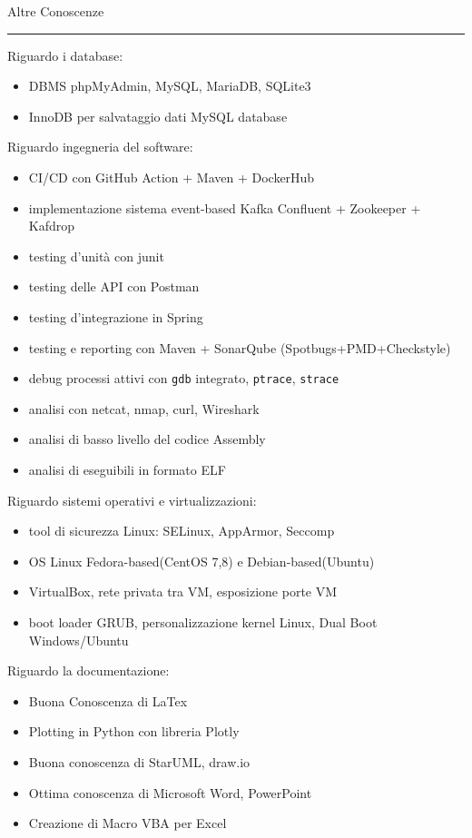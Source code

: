 \documentclass[a4paper]{letter}
\begin{document}
\hfill
\begin{minipage}[t]{0.65\textwidth}
\setlength{\baselineskip}{1.4\baselineskip}

\vspace{2 mm}
{\large Altre Conoscenze}
\rule{\linewidth}{0.4pt}
\vspace{1 mm}
{\medium Riguardo i database: }
\begin{itemize}
    \item DBMS phpMyAdmin, MySQL, MariaDB, SQLite3
    \item InnoDB per salvataggio dati MySQL database
\end{itemize}
\vspace{1 mm}
{\medium Riguardo ingegneria del software: }
\begin{itemize}
    \item CI/CD con GitHub Action + Maven + DockerHub
    \item implementazione sistema event-based Kafka Confluent + Zookeeper + Kafdrop
    \item testing d'unità con junit
    \item testing delle API con Postman
    \item testing d'integrazione in Spring
    \item testing e reporting con Maven + SonarQube (Spotbugs+PMD+Checkstyle)
    \item debug processi attivi con \texttt{gdb} integrato, \texttt{ptrace}, \texttt{strace}
    \item analisi con netcat, nmap, curl, Wireshark
    \item analisi di basso livello del codice Assembly
    \item analisi di eseguibili in formato ELF
\end{itemize}
\vspace{1 mm}
{\medium Riguardo sistemi operativi e virtualizzazioni: }
\begin{itemize}
    \item tool di sicurezza Linux: SELinux, AppArmor, Seccomp
    \item OS Linux Fedora-based(CentOS 7,8) e Debian-based(Ubuntu)  
    \item VirtualBox, rete privata tra VM, esposizione porte VM
    \item boot loader GRUB, personalizzazione kernel Linux, Dual Boot Windows/Ubuntu
\end{itemize}
\vspace{1 mm}
{\medium Riguardo la documentazione: }
\begin{itemize}
    \item Buona Conoscenza di LaTex
    \item Plotting in Python con libreria Plotly
    \item Buona conoscenza di StarUML, draw.io 
    \item Ottima conoscenza di Microsoft Word, PowerPoint
    \item Creazione di Macro VBA per Excel
\end{itemize}

\end{minipage}
\end{document}
